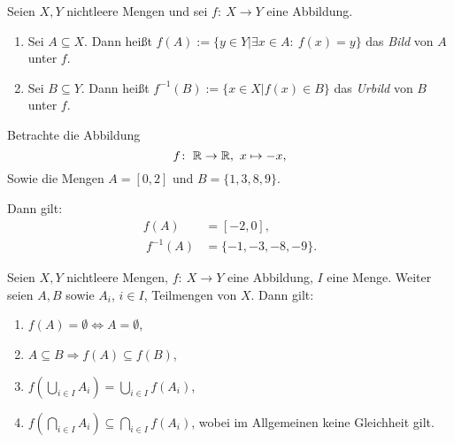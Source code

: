 \begin{frame}
\begin{mydef}
Seien $X,Y$ nichtleere Mengen und sei $f\!:\ X \to Y$ eine Abbildung.

\begin{enumerate}
\item Sei $A \subseteq X$.
Dann heißt $f(A) := \{y \in Y | \exists x \in A\!:\ f(x) = y \}$
das \textit{Bild} von $A$ unter $f$.

\item Sei $B \subseteq Y$.
Dann heißt $f^{-1}(B) := \{x \in X | f(x) \in B \}$
das \textit{Urbild} von $B$ unter $f$.
\end{enumerate}
\end{mydef}
\end{frame}


\begin{frame}
\begin{example}
Betrachte die Abbildung
\[
  f\!:\ \mathbb{R} \to \mathbb{R}, \ x \mapsto -x,
\]
Sowie die Mengen $A = [0,2]$ und $B = \{1,3,8,9\}$.

Dann gilt:
\begin{align*}
  f(A)      &= [-2,0], \\\
    f^{-1}(A) &= \{-1, -3,-8,-9\}.
\end{align*}
\end{example}
\end{frame}


\begin{frame}
\begin{theorem}
Seien $X,Y$ nichtleere Mengen, $f\!:\ X \to Y$ eine Abbildung, $I$ eine Menge.
Weiter seien $A,B$ sowie $A_i$, $i \in I$, Teilmengen von $X$.
Dann gilt:

\begin{enumerate}
\item $f(A) = \emptyset \iff A = \emptyset$,
\item $A \subseteq B \Rightarrow f(A) \subseteq f(B)$,
\item $f(\bigcup_{i \in I} A_i) = \bigcup_{i \in I} f(A_i)$,
\item $f(\bigcap_{i \in I} A_i) \subseteq \bigcap_{i \in I} f(A_i)$, wobei im
Allgemeinen keine Gleichheit gilt.
\end{enumerate}
\end{theorem}
\end{frame}


